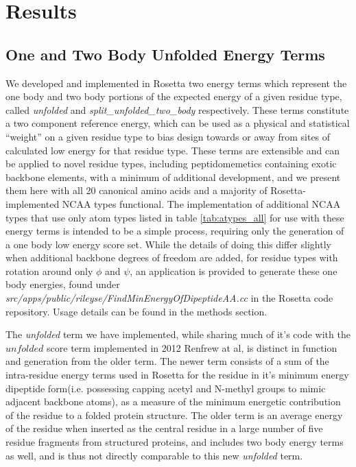 \section{Results}


\subsection{One and Two Body Unfolded Energy Terms}
We developed and implemented in Rosetta two energy terms which represent the one body and two body portions of the expected energy of a given residue type, called \textit{unfolded} and \textit{split\_unfolded\_two\_body} respectively. 
These terms constitute a two component reference energy, which can be used as a physical and statistical ``weight'' on a given residue type to bias design towards or away from sites of calculated low energy for that residue type.
These terms are extensible and can be applied to novel residue types, including peptidomemetics containing exotic backbone elements, with a minimum of additional development, and we present them here with all 20 canonical amino acids and a majority of Rosetta-implemented NCAA types functional.
The implementation of additional NCAA types that use only atom types listed in table \ref{tab:atypes_all} for use with these energy terms is intended to be a simple process, requiring only the generation of a one body low energy score set.
While the details of doing this differ slightly when additional backbone degrees of freedom are added, for residue types with rotation around only $\phi$ and $\psi$, an application is provided to generate these one body energies, found under \textit{src/apps/public/rileyse/FindMinEnergyOfDipeptideAA.cc} in the Rosetta code repository.
Usage details can be found in the methods section.

The \textit{unfolded} term we have implemented, while sharing much of it's code with the $unfolded$ score term implemented in 2012 Renfrew at al\cite{renfrew_incorporation_2012}, is distinct in function and generation from the older term.
The newer term consists of a sum of the intra-residue energy terms used in Rosetta for the residue in it's minimum energy dipeptide form(i.e. possessing capping acetyl and N-methyl groups to mimic adjacent backbone atoms), as a measure of the minimum energetic contribution of the residue to a folded protein structure.
The older term is an average energy of the residue when inserted as the central residue in a large number of five residue fragments from structured proteins, and includes two body energy terms as well, and is thus not directly comparable to this new \textit{unfolded} term.

